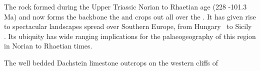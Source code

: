 The rock formed during the Upper Triassic Norian to Rhaetian age (228 -101.3 Ma) and now forms the backbone the  \citep{bosellini1974triassic} and crops out all over the  \citep{fischer1975tidal,schwarzacher2005stratification}. It has given rise to spectacular landscapes spread over Southern Europe, from Hungary \citep{haas2004characteristics} to Sicily \citep{catalano1974ciclotemi}.
Its ubiquity has wide ranging implications for the palaeogeography of this region in Norian to Rhaetian times.

\begin{marginfigure}
\caption{The well bedded Dachstein limestone outcrops on the western cliffs of  }
\label{fig:dachstein}
\end{marginfigure}

